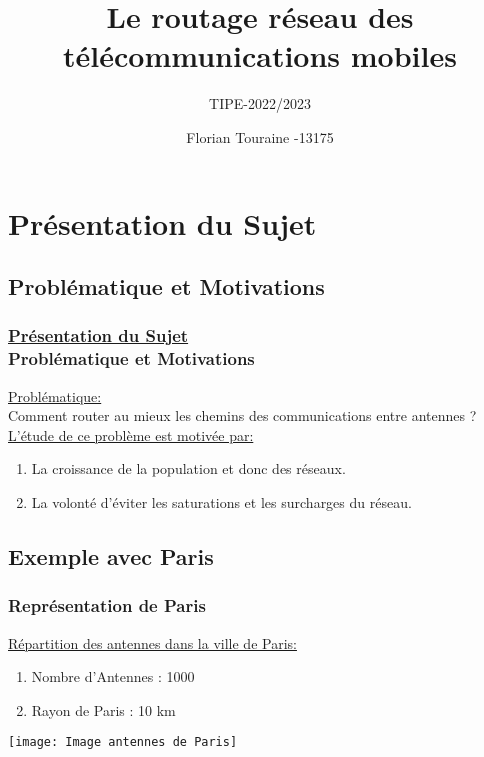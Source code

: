 \documentclass[t,10pt]{beamer}
\title{Le routage réseau des télécommunications mobiles }
\subtitle{TIPE-2022/2023}
\author{Florian Touraine -13175}
\date{}
\begin{document}
    \maketitle

    \begin{frame}
        \tableofcontents[]
    \end{frame}

    \section{Présentation du Sujet}
    \subsection{Problématique et Motivations}
    \begin{frame}\frametitle{\underline{Présentation du Sujet} \\ \small Problématique et Motivations}
        \underline{Problématique:} \\
        Comment router au mieux les chemins des communications entre antennes ?
        \\
        \vspace{0.5cm}
        \underline{L'étude de ce problème est motivée par:}
        \begin{enumerate}
            \item La croissance de la population et donc des réseaux.
            \item La volonté d'éviter les saturations et les surcharges du réseau.
        \end{enumerate}
    \end{frame}

    \subsection{Exemple avec Paris}
    \begin{frame}\frametitle{\small Représentation de Paris}
        \underline{Répartition des antennes dans la ville de Paris:}
        \begin{enumerate}
            \item Nombre d'Antennes : 1000
            \item Rayon de Paris : 10 km
        \end{enumerate}
        \texttt{[image: Image antennes de Paris]}
    \end{frame}
\end{document}
